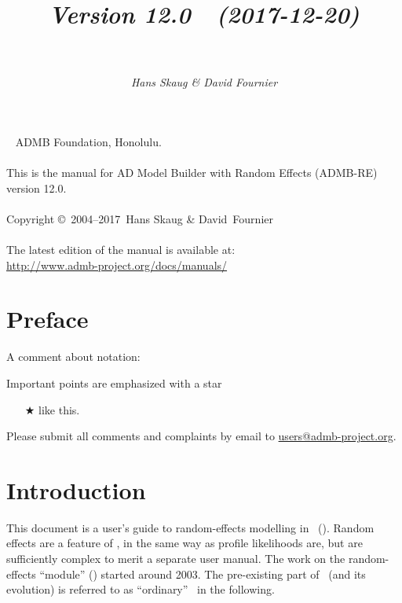 \documentclass{admbmanual}
\newcommand\admbversion{12.0}
\newcommand\admbyear{2017}
\newcommand\admbdate{2017-12-20}
\begin{document}
\title{%
  \vspace{4.5ex}\textsf{\textit{Version \admbversion~~(\admbdate)\\[3pt]
      ~%
    }}\vspace{3ex}
}
\author{\textsf{\textit{Hans Skaug \& David Fournier}}}

\maketitle

~\vfill
\noindent ADMB Foundation, Honolulu.\\\\
\noindent This is the manual for AD Model Builder with Random Effects (ADMB-RE)
version \admbversion.\\\\
\noindent Copyright \copyright\ 2004--\admbyear\ Hans Skaug \& David~Fournier\\\\
\noindent The latest edition of the manual is available at:\\
\url{http://www.admb-project.org/docs/manuals/}

\tableofcontents

\chapter*{Preface}

A comment about notation:

Important points are emphasized with a star
\begin{itemize}
  \item[$\bigstar$] like this.
\end{itemize}

Please submit all comments and complaints by email to
\href{mailto:users@admb-project.org}{users@admb-project.org}.

\chapter{Introduction}

This document is a user's guide to random-effects modelling in \ADM\ (\scAB).
Random effects are a feature of \scAB, in the same way as profile likelihoods
are, but are sufficiently complex to merit a separate user manual. The work on
the random-effects ``module'' (\scAR) started around 2003. The pre-existing part
of \scAB\ (and its evolution) is referred to as ``ordinary'' \scAB\ in the
following.
\end{document}
